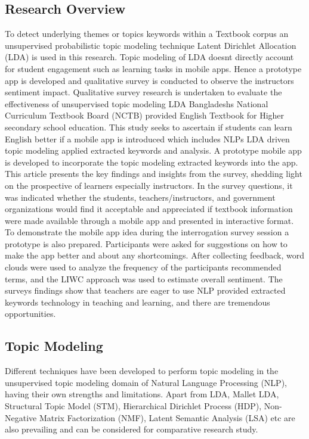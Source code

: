\documentclass[sn-mathphys,Numbered]{sn-jnl}%
\theoremstyle{thmstyleone}%
\theoremstyle{thmstyletwo}%
\theoremstyle{thmstylethree}%
\begin{document}
\subsection{Research Overview} 
To detect underlying themes or topics keywords within a Textbook corpus an unsupervised probabilistic topic modeling technique Latent Dirichlet Allocation (LDA) is used in this research. Topic modeling of LDA doesn\textquotesingle t directly account for student engagement such as learning tasks in mobile apps. Hence a prototype app is developed and qualitative survey is conducted to observe the instructor\textquotesingle s sentiment impact. Qualitative survey research is undertaken to evaluate the effectiveness of unsupervised topic modeling LDA Bangladesh\textquotesingle s National Curriculum Textbook Board (NCTB) provided English Textbook for Higher secondary school education. This study seeks to ascertain if students can learn English better if a mobile app is introduced which includes NLP\textquotesingle s LDA driven topic modeling applied extracted keywords and analysis. A prototype mobile app is developed to incorporate the topic modeling extracted keywords into the app. This article presents the key findings and insights from the survey, shedding light on the prospective of learners especially instructors. In the survey questions, it was indicated whether the students, teachers/instructors, and government organizations would find it acceptable and appreciated if textbook information were made available through a mobile app and presented in interactive format. To demonstrate the mobile app idea during the interrogation survey session a prototype is also prepared. Participants were asked for suggestions on how to make the app better and about any shortcomings. After collecting feedback, word clouds were used to analyze the frequency of the participants\textquotesingle{} recommended terms, and the LIWC approach was used to estimate overall sentiment. The survey\textquotesingle s findings show that teachers are eager to use NLP provided extracted keywords technology in teaching and learning, and there are tremendous opportunities.

\subsection{Topic Modeling}
 Different techniques have been developed to perform topic modeling in the unsupervised topic modeling domain of Natural Language Processing (NLP), having their own strengths and limitations. Apart from LDA, Mallet LDA, Structural Topic Model (STM), Hierarchical Dirichlet Process (HDP), Non-Negative Matrix Factorization (NMF), Latent Semantic Analysis (LSA) etc are also prevailing and can be considered for comparative research study.
\end{document}
